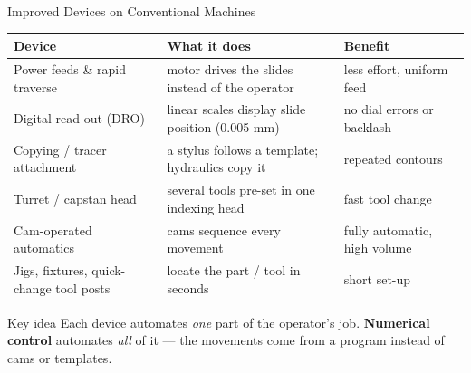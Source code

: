 \documentclass[aspectratio=169]{beamer}
\begin{document}
	\begin{frame}{Improved Devices on Conventional Machines}
		\renewcommand{\arraystretch}{1.1}
		\centering
		\footnotesize
		\begin{tabular}{@{}>{\raggedright}p{3.6cm}>{\raggedright}p{5.6cm}>{\raggedright\arraybackslash}p{3.8cm}@{}}
			\toprule
			\textbf{Device} & \textbf{What it does} & \textbf{Benefit} \\
			\midrule
			Power feeds \& rapid traverse & motor drives the slides instead of the operator & less effort, uniform feed \\
			Digital read-out (DRO)        & linear scales display slide position (0.005 mm) & no dial errors or backlash \\
			Copying / tracer attachment  & a stylus follows a template; hydraulics copy it & repeated contours \\
			Turret / capstan head         & several tools pre-set in one indexing head & fast tool change \\
			Cam-operated automatics       & cams sequence every movement & fully automatic, high volume \\
			Jigs, fixtures, quick-change tool posts & locate the part / tool in seconds & short set-up \\
			\bottomrule
		\end{tabular}
		\vspace{0.15cm}
		\begin{block}{Key idea}
			\small Each device automates \emph{one} part of the operator's job. \textbf{Numerical control} automates \emph{all} of it --- the movements come from a program instead of cams or templates.
		\end{block}
	\end{frame}
\end{document}
